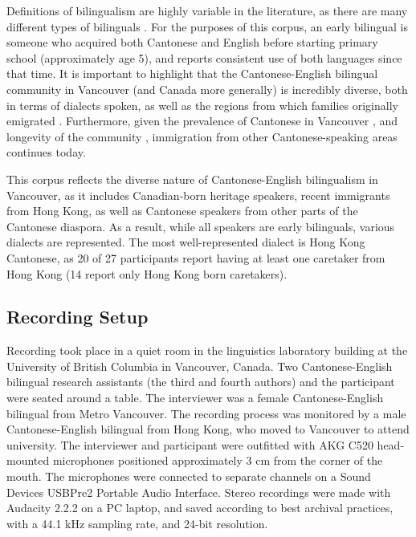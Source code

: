 Definitions of bilingualism are highly variable in the literature, as there are many different types of bilinguals \citep{amengual_2017_type}. For the purposes of this corpus, an early bilingual is someone who acquired both Cantonese and English before starting primary school (approximately age 5), and reports consistent use of both languages since that time. It is important to highlight that the Cantonese-English bilingual community in Vancouver (and Canada more generally) is incredibly diverse, both in terms of dialects spoken, as well as the regions from which families originally emigrated \citep{yu_2013_diaspora}. Furthermore, given the prevalence of Cantonese in Vancouver \citep{statistics_2017_proportion}, and longevity of the community \citep{yu_2013_diaspora}, immigration from other Cantonese-speaking areas continues today. 

This corpus reflects the diverse nature of Cantonese-English bilingualism in Vancouver, as it includes Canadian-born heritage speakers, recent immigrants from Hong Kong, as well as Cantonese speakers from other parts of the Cantonese diaspora. As a result, while all speakers are early bilinguals, various dialects are represented. The most well-represented dialect is Hong Kong Cantonese, as 20 of 27 participants report having at least one caretaker from Hong Kong (14 report only Hong Kong born caretakers). 

\subsection{Recording Setup}\label{ch2:subsec:setup}
Recording took place in a quiet room in the linguistics laboratory building at the University of British Columbia in Vancouver, Canada. Two Cantonese-English bilingual research assistants (the third and fourth authors) and the participant were seated around a table. The interviewer was a female Cantonese-English bilingual from Metro Vancouver. The recording process was monitored by a male Cantonese-English bilingual from Hong Kong, who moved to Vancouver to attend university. The interviewer and participant were outfitted with AKG C520 head-mounted microphones positioned approximately 3 cm from the corner of the mouth. The microphones were connected to separate channels on a Sound Devices USBPre2 Portable Audio Interface. Stereo recordings were made with Audacity 2.2.2 \citep{audacity_2018_audio} on a PC laptop, and saved according to best archival practices, with a 44.1 kHz sampling rate, and 24-bit resolution.

